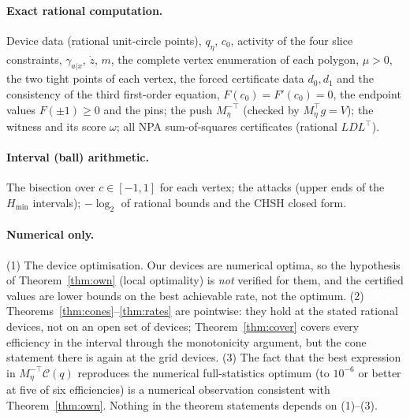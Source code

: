 \documentclass[11pt]{article}
\theoremstyle{definition}\newtheorem{definition}{Definition}
\theoremstyle{remark}\newtheorem{remark}{Remark}
\begin{document}
\paragraph{Exact rational computation.} Device data (rational unit-circle points), $q_\eta$, $c_0$, activity of the four slice constraints, $\gamma_{a|x}$, $\dot z$, $m$, the complete vertex enumeration of each polygon, $\mu>0$, the two tight points of each vertex, the forced certificate data $d_0,d_1$ and the consistency of the third first-order equation, $F(c_0)=F'(c_0)=0$, the endpoint values $F(\pm1)\ge0$ and the pins; the push $M_\eta^{-\top}$ (checked by $M_\eta^\top g=V$); the witness and its score $\omega$; all NPA sum-of-squares certificates (rational $LDL^\top$).
\paragraph{Interval (ball) arithmetic.} The bisection over $c\in[-1,1]$ for each vertex; the attacks (upper ends of the $H_{\min}$ intervals); $-\log_2$ of rational bounds and the CHSH closed form.
\paragraph{Numerical only.} (1) The device optimisation. Our devices are numerical optima, so the hypothesis of Theorem~\ref{thm:own} (local optimality) is \emph{not} verified for them, and the certified values are lower bounds on the best achievable rate, not the optimum. (2) Theorems~\ref{thm:cones}--\ref{thm:rates} are pointwise: they hold at the stated rational devices, not on an open set of devices; Theorem~\ref{thm:cover} covers every efficiency in the interval through the monotonicity argument, but the cone statement there is again at the grid devices. (3) The fact that the best expression in $M_\eta^{-\top}\mathcal C(q)$ reproduces the numerical full-statistics optimum (to $10^{-6}$ or better at five of six efficiencies) is a numerical observation consistent with Theorem~\ref{thm:own}. Nothing in the theorem statements depends on (1)--(3).
\end{document}
